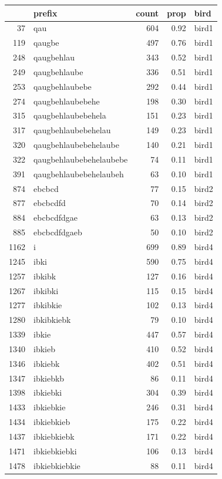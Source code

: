 \begin{table}[ht]
\centering
\begin{tabular}{rlrrl}
  \hline
 & prefix & count & prop & bird \\ 
  \hline
37 & qau & 604 & 0.92 & bird1 \\ 
  119 & qaugbe & 497 & 0.76 & bird1 \\ 
  248 & qaugbehlau & 343 & 0.52 & bird1 \\ 
  249 & qaugbehlaube & 336 & 0.51 & bird1 \\ 
  253 & qaugbehlaubebe & 292 & 0.44 & bird1 \\ 
  274 & qaugbehlaubebehe & 198 & 0.30 & bird1 \\ 
  315 & qaugbehlaubebehela & 151 & 0.23 & bird1 \\ 
  317 & qaugbehlaubebehelau & 149 & 0.23 & bird1 \\ 
  320 & qaugbehlaubebehelaube & 140 & 0.21 & bird1 \\ 
  322 & qaugbehlaubebehelaubebe &  74 & 0.11 & bird1 \\ 
  391 & qaugbehlaubebehelaubeh &  63 & 0.10 & bird1 \\ 
  874 & ebcbcd &  77 & 0.15 & bird2 \\ 
  877 & ebcbcdfd &  70 & 0.14 & bird2 \\ 
  884 & ebcbcdfdgae &  63 & 0.13 & bird2 \\ 
  885 & ebcbcdfdgaeb &  50 & 0.10 & bird2 \\ 
  1162 & i & 699 & 0.89 & bird4 \\ 
  1245 & ibki & 590 & 0.75 & bird4 \\ 
  1257 & ibkibk & 127 & 0.16 & bird4 \\ 
  1267 & ibkibki & 115 & 0.15 & bird4 \\ 
  1277 & ibkibkie & 102 & 0.13 & bird4 \\ 
  1280 & ibkibkiebk &  79 & 0.10 & bird4 \\ 
  1339 & ibkie & 447 & 0.57 & bird4 \\ 
  1340 & ibkieb & 410 & 0.52 & bird4 \\ 
  1346 & ibkiebk & 402 & 0.51 & bird4 \\ 
  1347 & ibkiebkb &  86 & 0.11 & bird4 \\ 
  1398 & ibkiebki & 304 & 0.39 & bird4 \\ 
  1433 & ibkiebkie & 246 & 0.31 & bird4 \\ 
  1434 & ibkiebkieb & 175 & 0.22 & bird4 \\ 
  1437 & ibkiebkiebk & 171 & 0.22 & bird4 \\ 
  1471 & ibkiebkiebki & 106 & 0.13 & bird4 \\ 
  1478 & ibkiebkiebkie &  88 & 0.11 & bird4 \\ 
   \hline
\end{tabular}
\end{table}
